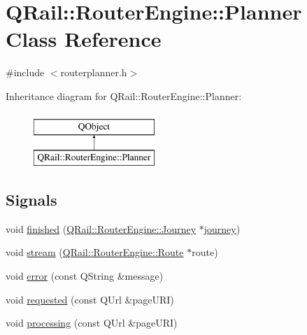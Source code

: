\hypertarget{classQRail_1_1RouterEngine_1_1Planner}{}\section{Q\+Rail\+::Router\+Engine\+::Planner Class Reference}
\label{classQRail_1_1RouterEngine_1_1Planner}


{\ttfamily \#include $<$routerplanner.\+h$>$}

Inheritance diagram for Q\+Rail\+::Router\+Engine\+::Planner\+:\begin{figure}[H]
\begin{center}
\leavevmode
\includegraphics[height=2.000000cm]{classQRail_1_1RouterEngine_1_1Planner}
\end{center}
\end{figure}
\subsection*{Signals}
\begin{DoxyCompactItemize}
\item 
void \mbox{\hyperlink{classQRail_1_1RouterEngine_1_1Planner_ada19d57ce540325d6de9c29521ca6dfd}{finished}} (\mbox{\hyperlink{classQRail_1_1RouterEngine_1_1Journey}{Q\+Rail\+::\+Router\+Engine\+::\+Journey}} $\ast$\mbox{\hyperlink{classQRail_1_1RouterEngine_1_1Planner_af3ae9c83f09d8dadabe6d0e24b22401e}{journey}})
\item 
void \mbox{\hyperlink{classQRail_1_1RouterEngine_1_1Planner_a0221f287017cfb3a24826d1ce349120c}{stream}} (\mbox{\hyperlink{classQRail_1_1RouterEngine_1_1Route}{Q\+Rail\+::\+Router\+Engine\+::\+Route}} $\ast$route)
\item 
void \mbox{\hyperlink{classQRail_1_1RouterEngine_1_1Planner_af6fce3843991fb2ab155fba9bfd3e6b4}{error}} (const Q\+String \&message)
\item 
void \mbox{\hyperlink{classQRail_1_1RouterEngine_1_1Planner_a048be5d38aa731894e585aa4ceb4bc68}{requested}} (const Q\+Url \&page\+U\+RI)
\item 
void \mbox{\hyperlink{classQRail_1_1RouterEngine_1_1Planner_a2ea8cbe8a514124729079cd793ff8454}{processing}} (const Q\+Url \&page\+U\+RI)
\end{DoxyCompactItemize}
